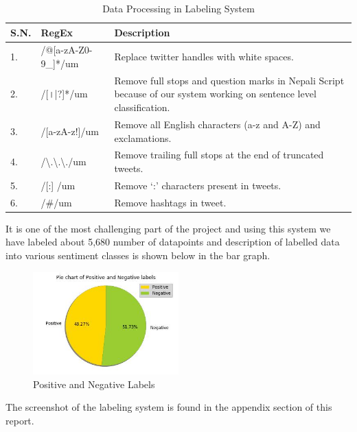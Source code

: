         \begin{table}[h]
            \centering
            \caption{Data Processing in Labeling System}
           \begin{tabular}{|p{3cm}|p{4cm}|p{5cm}|}
                \hline
                \textbf{S.N.} & \textbf{RegEx} & \textbf{Description} \\
                \hline
                1. & /@[a-zA-Z0-9_]*/um & Replace twitter handles with white spaces. \\
                \hline
                2. & /[।|?]*/um & Remove full stops and question marks in Nepali Script because of our system working on sentence level classification. \\
                \hline
                 3. & /[a-zA-z!]/um & Remove all English characters (a-z and A-Z) and exclamations. \\
                \hline
                 4. & /\textbackslash.\textbackslash.\textbackslash./um & Remove trailing full stops at the end of truncated tweets. \\
                \hline
                5. & /[:] /um & Remove ‘:’ characters present in tweets. \\
                \hline
                 6. & /#/um & Remove hashtags in tweet. \\
                \hline
            \end{tabular}
        \end{table}
It is one of the most challenging part of the project and using this system we have
labeled about 5,680 number of datapoints and description of labelled data into various
sentiment classes is shown below in the bar graph.
        \begin{figure}[hbt!]
            \centering
                \includegraphics[width=0.5\textwidth]{./img/6.25.jpg}
                \caption{Positive and Negative Labels}
        \end{figure}

The screenshot of the labeling system is found in the appendix section of this report.
